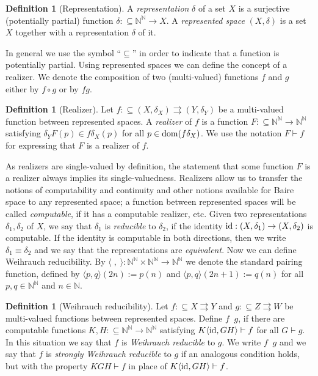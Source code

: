 \documentclass[a4paper]{amsart}
\def\IN{{\mathbb{N}}}
\def\In{\subseteq}
\def\mto{\rightrightarrows}
\def\id{{\rm id}}
\def\dom{{\rm dom}}
\def\Baire{{\IN^\IN}}
\def\leqW{\mathop{\leq_{\mathrm{W}}}}
\def\leqSW{\mathop{\leq_{\mathrm{sW}}}}
\theoremstyle{definition}
\newtheorem{definition}[theorem]{Definition}
\begin{document}
\begin{definition}[Representation]
A \emph{representation} $\delta$ of a set $X$ is a surjective (potentially partial)
function $\delta :\In\Baire\to X$. A \emph{represented space} $(X, \delta)$ is a set $X$ together
with a representation $\delta$ of it.
\end{definition}

In general we use the symbol ``$\In$'' in order to indicate that a function is potentially partial.
Using represented spaces we can define the concept of a realizer. We denote the composition of
two (multi-valued) functions $f$ and $g$ either by $f\circ g$ or by $fg$.

\begin{definition}[Realizer]
Let $f : \In (X, \delta_X) \mto (Y, \delta_Y)$ be a multi-valued function between represented spaces.
A \emph{realizer} of $f$ is a function $F :\In \Baire \to \Baire$ satisfying
$\delta_YF(p)\in f\delta_X(p)$ for all $p\in\dom(f\delta_X)$.
We use the notation $F \vdash f$ for expressing that $F$ is a realizer of $f$.
\end{definition}

As realizers are single-valued by definition, the statement that some function $F$ is a realizer
always implies its single-valuedness. Realizers allow us to transfer the notions of computability
and continuity and other notions available for Baire space to any represented space;
a function between represented spaces will be called {\em computable}, if it has a computable realizer, etc.
Given two representations $\delta_1,\delta_2$ of $X$, we say that $\delta_1$ is {\em reducible} to $\delta_2$,
if the identity $\id:(X,\delta_1)\to(X,\delta_2)$ is computable. If the identity is computable in both directions,
then we write $\delta_1\equiv\delta_2$ and we say that the representations are {\em equivalent}.
Now we can define Weihrauch reducibility.
By $\langle\;,\;\rangle:\Baire\times\Baire\to\Baire$ we denote the standard pairing function, defined by
$\langle p,q\rangle(2n):=p(n)$ and $\langle p,q\rangle(2n+1):=q(n)$ for all $p,q\in\Baire$ and $n\in\IN$.

\begin{definition}[Weihrauch reducibility]
Let $f:\In X\mto Y$ and $g:\In Z\mto W$ be multi-valued functions between represented spaces. Define $f \leqW g$, if there are computable
functions $K,H:\In\IN^\IN\to\IN^\IN$ satisfying $K\langle \id, GH \rangle \vdash f$ for all $G \vdash g$.
In this situation we say that $f$ is {\em Weihrauch reducible} to $g$. We write $f\leqSW g$ and we say that $f$ is
{\em strongly Weihrauch reducible} to $g$ if an analogous condition holds, but with the property $KGH\vdash f$
in place of  $K\langle \id, GH \rangle \vdash f$.
\end{definition}
\end{document}

